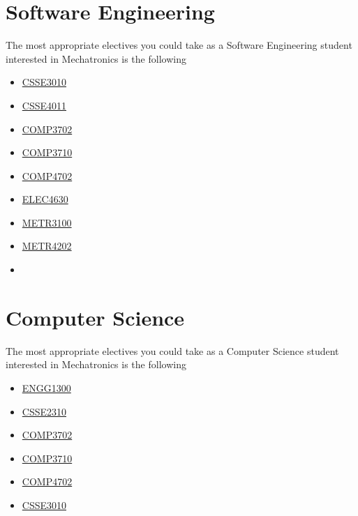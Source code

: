 \section{Software Engineering}
The most appropriate electives you could take as a Software Engineering student interested in Mechatronics is the following
\begin{multicols}{3}
    \begin{itemize}
        \item \hyperlink{CSSE3010}{CSSE3010}
        \item \hyperlink{CSSE4011}{CSSE4011}
        \item \hyperlink{COMP3702}{COMP3702}
        \item \hyperlink{COMP3710}{COMP3710}
        \item \hyperlink{COMP4702}{COMP4702}
        \item \hyperlink{ELEC4630}{ELEC4630}
        \item \hyperlink{METR3100}{METR3100}
        \item \hyperlink{METR4202}{METR4202}
        \item[]
    \end{itemize}
\end{multicols}

\section{Computer Science}
The most appropriate electives you could take as a Computer Science student interested in Mechatronics is the following
\begin{multicols}{3}
    \begin{itemize}
        \item \hyperlink{ENGG1300}{ENGG1300}
        \item \hyperlink{CSSE2310}{CSSE2310}
        \item \hyperlink{COMP3702}{COMP3702}
        \item \hyperlink{COMP3710}{COMP3710}
        \item \hyperlink{COMP4702}{COMP4702}
        \item \hyperlink{CSSE3010}{CSSE3010}
    \end{itemize}
\end{multicols}
